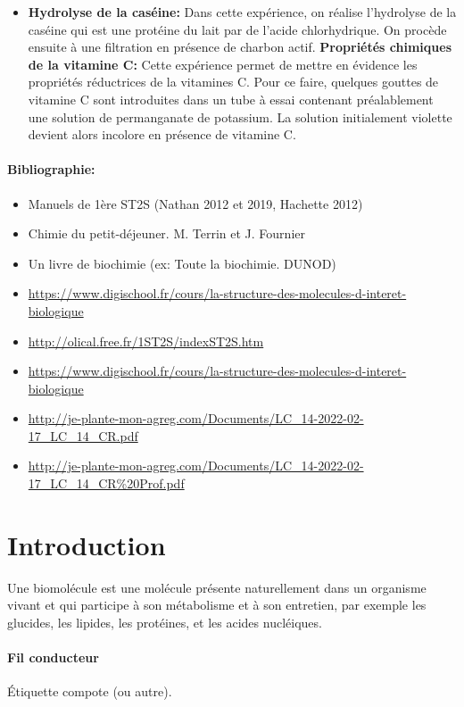 \documentclass[11pt]{report}
\numberwithin{figure}{section}
\numberwithin{equation}{section}
\numberwithin{table}{section}
\newcommand{\1}{\boldsymbol{1}}
\begin{document}
\begin{itemize}
\item \textbf{Hydrolyse de la caséine:} Dans cette expérience, on réalise l’hydrolyse de la caséine qui est une protéine du lait par de l’acide
chlorhydrique. On procède ensuite à une filtration en présence de charbon actif. 
\textbf{Propriétés chimiques de la vitamine C:} Cette expérience permet de mettre en évidence les propriétés réductrices de la vitamines C. Pour ce faire, quelques gouttes de vitamine C sont introduites dans un tube à essai contenant préalablement une solution de permanganate de potassium. La solution initialement violette devient alors incolore en présence de vitamine C. 
\end{itemize} 

\paragraph*{Bibliographie:}
\begin{itemize}
\item Manuels de 1ère ST2S (Nathan 2012 et 2019, Hachette 2012)
\item Chimie du petit-déjeuner. M. Terrin et J. Fournier
\item Un livre de biochimie (ex: Toute la biochimie. DUNOD)
\item \url{https://www.digischool.fr/cours/la-structure-des-molecules-d-interet-biologique}
\item \url{http://olical.free.fr/1ST2S/indexST2S.htm}
\item \url{https://www.digischool.fr/cours/la-structure-des-molecules-d-interet-biologique}
\item \url{http://je-plante-mon-agreg.com/Documents/LC_14-2022-02-17_LC_14_CR.pdf}
\item \url{http://je-plante-mon-agreg.com/Documents/LC_14-2022-02-17_LC_14_CR%20Prof.pdf}
\end{itemize}

\section*{Introduction}

Une biomolécule est une molécule présente naturellement dans un organisme vivant et qui participe à son métabolisme et à son entretien, par exemple les glucides, les lipides, les protéines, et les acides nucléiques.

\paragraph*{Fil conducteur} Étiquette compote (ou autre).
\end{document}
